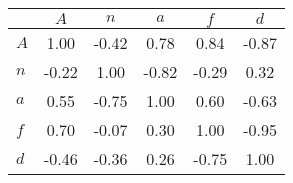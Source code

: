 \begin{tabular}{lccccc}
\toprule
 & $A$ & $n$ & $a$ & $f$ & $d$ \\
\midrule
$A$ & {\cellcolor[HTML]{2C1A4C}} \color[HTML]{F1F1F1} 1.00 & {\cellcolor[HTML]{B0B075}} \color[HTML]{000000} -0.42 & {\cellcolor[HTML]{284375}} \color[HTML]{F1F1F1} 0.78 & {\cellcolor[HTML]{29386A}} \color[HTML]{F1F1F1} 0.84 & {\cellcolor[HTML]{404016}} \color[HTML]{F1F1F1} -0.87 \\
$n$ & {\cellcolor[HTML]{D8D8B1}} \color[HTML]{000000} -0.22 & {\cellcolor[HTML]{2C1A4C}} \color[HTML]{F1F1F1} 1.00 & {\cellcolor[HTML]{4C4C20}} \color[HTML]{F1F1F1} -0.82 & {\cellcolor[HTML]{CCCC9B}} \color[HTML]{000000} -0.29 & {\cellcolor[HTML]{90AAC5}} \color[HTML]{F1F1F1} 0.32 \\
$a$ & {\cellcolor[HTML]{4B76A0}} \color[HTML]{F1F1F1} 0.55 & {\cellcolor[HTML]{5B5B2C}} \color[HTML]{F1F1F1} -0.75 & {\cellcolor[HTML]{2C1A4C}} \color[HTML]{F1F1F1} 1.00 & {\cellcolor[HTML]{3F6B99}} \color[HTML]{F1F1F1} 0.60 & {\cellcolor[HTML]{777744}} \color[HTML]{F1F1F1} -0.63 \\
$f$ & {\cellcolor[HTML]{2C5586}} \color[HTML]{F1F1F1} 0.70 & {\cellcolor[HTML]{EDEEDF}} \color[HTML]{000000} -0.07 & {\cellcolor[HTML]{97B0C8}} \color[HTML]{000000} 0.30 & {\cellcolor[HTML]{2C1A4C}} \color[HTML]{F1F1F1} 1.00 & {\cellcolor[HTML]{2F300A}} \color[HTML]{F1F1F1} -0.95 \\
$d$ & {\cellcolor[HTML]{A6A66B}} \color[HTML]{F1F1F1} -0.46 & {\cellcolor[HTML]{BEBE85}} \color[HTML]{000000} -0.36 & {\cellcolor[HTML]{A2B9CE}} \color[HTML]{000000} 0.26 & {\cellcolor[HTML]{5D5D2D}} \color[HTML]{F1F1F1} -0.75 & {\cellcolor[HTML]{2C1A4C}} \color[HTML]{F1F1F1} 1.00 \\
\bottomrule
\end{tabular}
